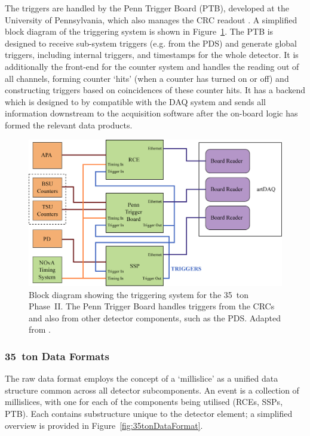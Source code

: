 The triggers are handled by the Penn Trigger Board (PTB), developed at the University of Pennsylvania, which also manages the CRC readout \cite{Barros2016}.  A simplified block diagram of the triggering system is shown in Figure~\ref{fig:35tonTriggering}.  The PTB is designed to receive sub-system triggers (e.g. from the PDS) and generate global triggers, including internal triggers, and timestamps for the whole detector.  It is additionally the front-end for the counter system and handles the reading out of all channels, forming counter `hits' (when a counter has turned on or off) and constructing triggers based on coincidences of these counter hits.  It has a backend which is designed to by compatible with the DAQ system and sends all information downstream to the acquisition software after the on-board logic has formed the relevant data products.

\begin{figure}
  \centering
  \includegraphics[width=12cm]{trigger_system.eps}
  \caption[Block diagram showing the triggering system for the 35~ton Phase~II.]{Block diagram showing the triggering system for the 35~ton Phase~II.  The Penn Trigger Board handles triggers from the CRCs and also from other detector components, such as the PDS.  Adapted from \cite{Barros2016}.}
  \label{fig:35tonTriggering}
\end{figure}

\subsubsection{35~ton Data Formats}\label{sec:35tonDataFormats}

The raw data format employs the concept of a `millislice' as a unified data structure common across all detector subcomponents.  An event is a collection of millislices, with one for each of the components being utilised (RCEs, SSPs, PTB).  Each contains substructure unique to the detector element; a simplified overview is provided in Figure~\ref{fig:35tonDataFormat}.

